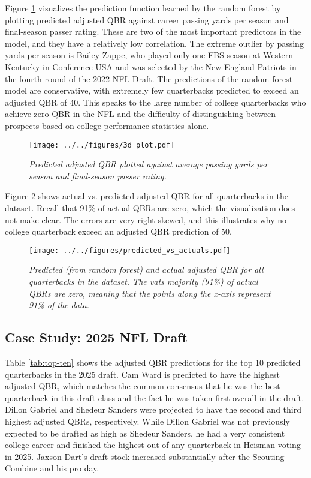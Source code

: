 \documentclass{article}
\begin{document}
Figure \ref{fig:3d-plot} visualizes the prediction function learned by the random forest by plotting predicted adjusted QBR against career passing yards per season and final-season passer rating. These are two of the most important predictors in the model, and they have a relatively low correlation. The extreme outlier by passing yards per season is Bailey Zappe, who played only one FBS season at Western Kentucky in Conference USA and was selected by the New England Patriots in the fourth round of the 2022 NFL Draft. The predictions of the random forest model are conservative, with extremely few quarterbacks predicted to exceed an adjusted QBR of 40. This speaks to the large number of college quarterbacks who achieve zero QBR in the NFL and the difficulty of distinguishing between prospects based on college performance statistics alone.

\begin{figure}[H]
    \centering
    \texttt{[image: ../../figures/3d\_plot.pdf]}
    \caption{\textit{Predicted adjusted QBR plotted against average passing yards per season and final-season passer rating.}}
    \label{fig:3d-plot}
\end{figure}

Figure \ref{fig:predicted-vs-actuals} shows actual vs. predicted adjusted QBR for all quarterbacks in the dataset. Recall that 91\% of actual QBRs are zero, which the visualization does not make clear. The errors are very right-skewed, and this illustrates why no college quarterback exceed an adjusted QBR prediction of 50.

\begin{figure}[H]
  \centering
  \texttt{[image: ../../figures/predicted\_vs\_actuals.pdf]}
  \caption{\textit{Predicted (from random forest) and actual adjusted QBR for all quarterbacks in the dataset. The vats majority (91\%) of actual QBRs are zero, meaning that the points along the x-axis represent 91\% of the data.}}
  \label{fig:predicted-vs-actuals}
\end{figure}

\subsection{Case Study: 2025 NFL Draft}

Table \ref{tab:top-ten} shows the adjusted QBR predictions for the top 10 predicted quarterbacks in the 2025 draft. Cam Ward is predicted to have the highest adjusted QBR, which matches the common consensus that he was the best quarterback in this draft class and the fact he was taken first overall in the draft. Dillon Gabriel and Shedeur Sanders were projected to have the second and third highest adjusted QBRs, respectively. While Dillon Gabriel was not previously expected to be drafted as high as Shedeur Sanders, he had a very consistent college career and finished the highest out of any quarterback in Heisman voting in 2025. Jaxson Dart's draft stock increased substantially after the Scouting Combine and his pro day.
\end{document}
